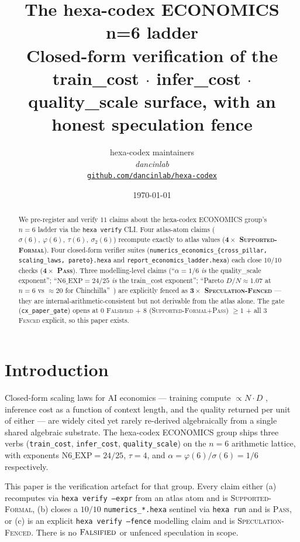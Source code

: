 \documentclass[11pt,a4paper]{article}
\title{
  \textbf{The hexa-codex ECONOMICS n=6 ladder}\\[4pt]
  \large Closed-form verification of the train\_cost $\cdot$ infer\_cost $\cdot$
  quality\_scale surface, with an honest speculation fence
}
\author{
  hexa-codex maintainers\\
  \normalsize\textit{dancinlab}\\[2pt]
  \normalsize\href{https://github.com/dancinlab/hexa-codex}{\texttt{github.com/dancinlab/hexa-codex}}
}
\date{\today}
\begin{document}
\maketitle

\begin{abstract}
We pre-register and verify $11$ claims about the hexa-codex ECONOMICS
group's $n=6$ ladder via the \texttt{hexa verify} CLI. Four atlas-atom
claims ($\sigma(6),\ \varphi(6),\ \tau(6),\ \sigma_2(6)$) recompute
exactly to atlas values (\textbf{$\mathbf{4 \times}$ \textsc{Supported-Formal}}).
Four closed-form verifier suites
(\texttt{numerics\_economics\_\{cross\_pillar, scaling\_laws, pareto\}.hexa}
and \texttt{report\_economics\_ladder.hexa}) each close $10/10$ checks
(\textbf{$\mathbf{4 \times}$ \textsc{Pass}}). Three modelling-level claims
(``$\alpha = 1/6$ \emph{is} the quality\_scale exponent'';
``$\mathrm{N6\_EXP} = 24/25$ \emph{is} the train\_cost exponent'';
``Pareto $D/N \approx 1.07$ at $n=6$ vs $\approx 20$ for
Chinchilla''~\cite{hoffmann2022chinchilla}) are explicitly fenced as
\textbf{$\mathbf{3 \times}$ \textsc{Speculation-Fenced}} --- they are
internal-arithmetic-consistent but not derivable from the atlas alone.
The gate (\texttt{cx\_paper\_gate}) opens at $0$ \textsc{Falsified} +
$8$ (\textsc{Supported-Formal}+\textsc{Pass}) $\ge 1$ + all $3$
\textsc{Fenced} explicit, so this paper exists.
\end{abstract}

\section{Introduction}
\label{sec:intro}

Closed-form scaling laws for AI economics --- training compute
$\propto N \cdot D$ \cite{hoffmann2022chinchilla,kaplan2020scaling},
inference cost as a function of context length, and the quality
returned per unit of either --- are widely cited yet rarely re-derived
algebraically from a single shared algebraic substrate. The
hexa-codex ECONOMICS group ships three verbs (\texttt{train\_cost},
\texttt{infer\_cost}, \texttt{quality\_scale}) on the $n=6$ arithmetic
lattice, with exponents $\mathrm{N6\_EXP} = 24/25$, $\tau = 4$, and
$\alpha = \varphi(6)/\sigma(6) = 1/6$ respectively.

This paper is the verification artefact for that group. Every claim
either (a) recomputes via \texttt{hexa verify --expr} from an atlas
atom and is \textsc{Supported-Formal}, (b) closes a $10/10$
\texttt{numerics\_*.hexa} sentinel via \texttt{hexa run} and is
\textsc{Pass}, or (c) is an explicit \texttt{hexa verify --fence}
modelling claim and is \textsc{Speculation-Fenced}. There is no
$\textsc{Falsified}$ or unfenced speculation in scope.
\end{document}
